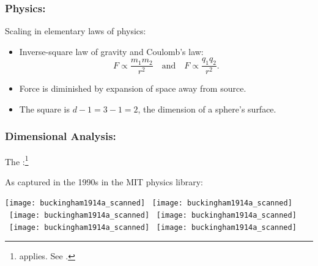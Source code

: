 \begin{frame}
  \frametitle{Physics:}

  \begin{block}{Scaling in elementary laws of physics:}
    \begin{itemize}
    \item 
      Inverse-square law of gravity
      and Coulomb's law: 
      $$
      F 
      \propto 
      \frac{m_1 m_2}{r^{2}}
      \quad 
      \mbox{and} 
      \quad
      F 
      \propto 
      \frac{q_1 q_2}{r^{2}}.
      $$
    \item 
      Force is diminished by expansion of space away from source.  
    \item 
      The square is $d-1=3-1=2$, the dimension of
      a sphere's surface.
    \end{itemize}
  \end{block}

\end{frame}


\begin{frame}
  \frametitle{Dimensional Analysis:}

  The 
  :\footnote{ applies.
    See .
  }

  \medskip


  \bigskip

  As captured in the 1990s in the MIT physics library:

  \medskip
  
  \texttt{[image: buckingham1914a\_scanned]}
  \
  \texttt{[image: buckingham1914a\_scanned]}
  \
  \texttt{[image: buckingham1914a\_scanned]}
  \
  \texttt{[image: buckingham1914a\_scanned]}
  \
  \texttt{[image: buckingham1914a\_scanned]}
  \
  \texttt{[image: buckingham1914a\_scanned]}

\end{frame}

